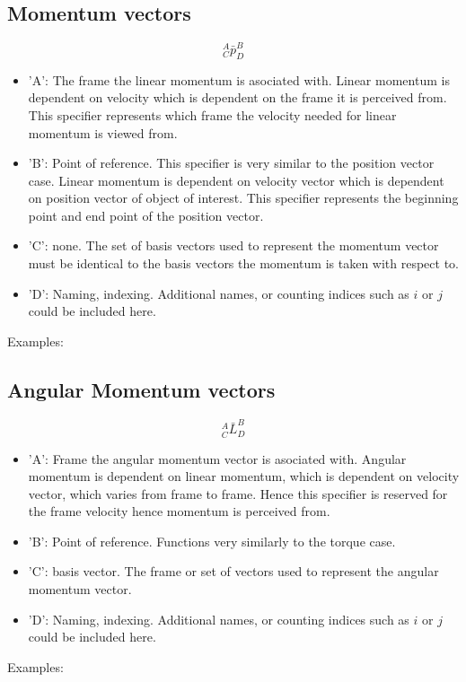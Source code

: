 \subsection{Momentum vectors}
\begin{comment}
unfinished
\end{comment}
$${}^{A}_{C}\bar{p}^{B}_{D}$$
\begin{itemize}
    \item 'A': The frame the linear momentum is asociated with. Linear momentum is dependent on velocity which is dependent on the frame it is perceived from. This specifier represents which frame the velocity needed for linear momentum is viewed from. 
    \item 'B': Point of reference. This specifier is very similar to the position vector case. Linear momentum is dependent on velocity vector which is dependent on position vector of object of interest. This specifier represents the beginning point and end point of the position vector.
    \item 'C': none. The set of basis vectors used to represent the momentum vector must be identical to the basis vectors the momentum is taken with respect to.
    \item 'D': Naming, indexing. Additional names, or counting indices such as $i$ or $j$ could be included here.
\end{itemize}
Examples:
\subsection{Angular Momentum vectors}
\begin{comment}
\end{comment}
$${}^{A}_{C}\bar{L}^{B}_{D}$$
\begin{itemize}
    \item 'A': Frame the angular momentum vector is asociated with. Angular momentum is dependent on linear momentum, which is dependent on velocity vector, which varies from frame to frame. Hence this specifier is reserved for the frame velocity hence momentum is perceived from.
    \item 'B': Point of reference. Functions very similarly to the torque case.
    \item 'C': basis vector. The frame or set of vectors used to represent the angular momentum vector.
    \item 'D': Naming, indexing. Additional names, or counting indices such as $i$ or $j$ could be included here.
\end{itemize}
Examples:

